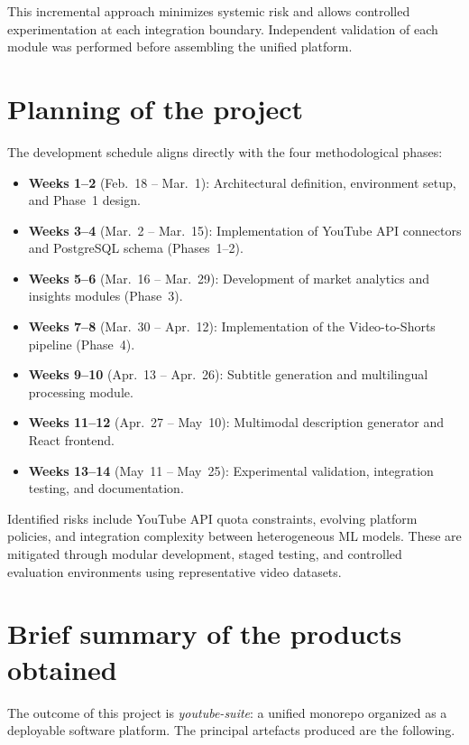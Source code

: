 \documentclass[ENG]{TFUOC}
\begin{document}
This incremental approach minimizes systemic risk and allows controlled experimentation at each integration boundary. Independent validation of each module was performed before assembling the unified platform.

\section{Planning of the project}

The development schedule aligns directly with the four methodological phases:

\begin{itemize}
\item \textbf{Weeks 1–2} (Feb.~18 – Mar.~1): Architectural definition, environment setup, and Phase~1 design.
\item \textbf{Weeks 3–4} (Mar.~2 – Mar.~15): Implementation of YouTube API connectors and PostgreSQL schema (Phases~1–2).
\item \textbf{Weeks 5–6} (Mar.~16 – Mar.~29): Development of market analytics and insights modules (Phase~3).
\item \textbf{Weeks 7–8} (Mar.~30 – Apr.~12): Implementation of the Video-to-Shorts pipeline (Phase~4).
\item \textbf{Weeks 9–10} (Apr.~13 – Apr.~26): Subtitle generation and multilingual processing module.
\item \textbf{Weeks 11–12} (Apr.~27 – May~10): Multimodal description generator and React frontend.
\item \textbf{Weeks 13–14} (May~11 – May~25): Experimental validation, integration testing, and documentation.
\end{itemize}

Identified risks include YouTube API quota constraints, evolving platform policies, and integration complexity between heterogeneous ML models. These are mitigated through modular development, staged testing, and controlled evaluation environments using representative video datasets.

\section{Brief summary of the products obtained}

The outcome of this project is \textit{youtube-suite}: a unified monorepo organized as a deployable software platform. The principal artefacts produced are the following.
\end{document}
